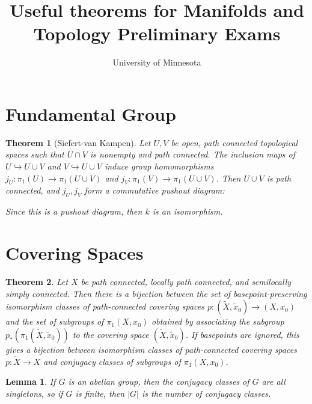 \documentclass{article}
\title{Useful theorems for Manifolds and Topology Preliminary Exams}
\author{University of Minnesota}
\newtheorem*{theorem}{Theorem}
\newtheorem*{lemma}{Lemma}
\begin{document}
\maketitle

\section{Fundamental Group}

\begin{theorem}[Siefert-van Kampen]

Let $U,V$ be open, path connected topological spaces such that $U \cap V$ is nonempty and path connected. The inclusion maps of $U \hookrightarrow U \cup V$ and $V \hookrightarrow U \cup V$ induce group homomorphisms $j_U:\pi_1(U) \rightarrow \pi_1(U \cup V)$ and $j_V: \pi_1(V) \rightarrow \pi_1(U \cup V)$. Then $U \cup V$ is path connected, and $j_U, j_V$ form a commutative pushout diagram:
			
			\begin{center}\end{center}

Since this is a pushout diagram, then $k$ is an isomorphism.

\end{theorem}

\section{Covering Spaces}

\begin{theorem}
Let $X$ be path connected, locally path connected, and semilocally simply connected. Then there is a bijection between the set of basepoint-preserving isomorphism classes of path-connected covering spaces $p:(\tilde{X},\tilde{x}_0) \rightarrow (X,x_0)$ and the set of subgroups of $\pi_1(X,x_0)$ obtained by associating the subgroup $p_*(\pi_1(\tilde{X}, \tilde{x}_0))$ to the covering space $(\tilde{X}, \tilde{x}_0)$. If basepoints are ignored, this gives a bijection between isomorphism classes of path-connected covering spaces $p: \tilde{X} \rightarrow X$ and conjugacy classes of subgroups of $\pi_1(X,x_0)$.
\end{theorem}

\begin{lemma}
	If $G$ is an abelian group, then the conjugacy classes of $G$ are all singletons, so if $G$ is finite, then $|G|$ is the number of conjugacy classes.
\end{lemma}
\end{document}
